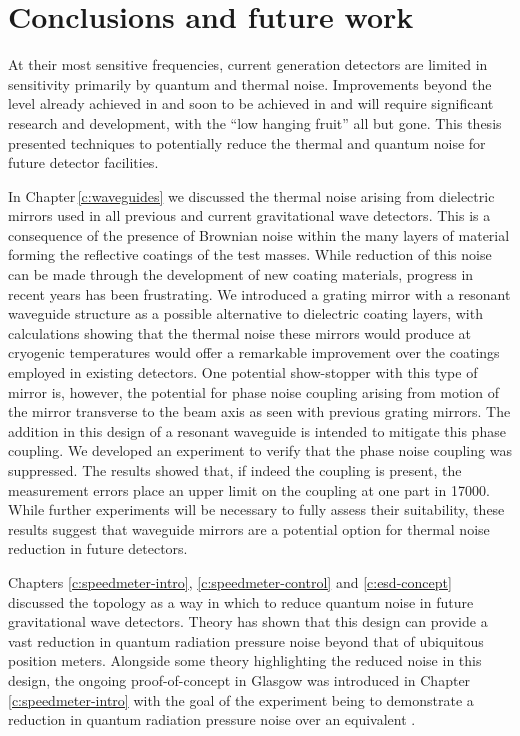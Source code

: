 \chapter{\label{c:conclusion}Conclusions and future work}

At their most sensitive frequencies, current generation detectors are limited in sensitivity primarily by quantum and thermal noise. Improvements beyond the level already achieved in \ALIGO{} and soon to be achieved in \AVIRGO{} and \KAGRA{} will require significant research and development, with the ``low hanging fruit'' all but gone. This thesis presented techniques to potentially reduce the thermal and quantum noise for future detector facilities.

In Chapter\,\ref{c:waveguides} we discussed the thermal noise arising from dielectric mirrors used in all previous and current gravitational wave detectors. This is a consequence of the presence of Brownian noise within the many layers of material forming the reflective coatings of the test masses. While reduction of this noise can be made through the development of new coating materials, progress in recent years has been frustrating. We introduced a grating mirror with a resonant waveguide structure as a possible alternative to dielectric coating layers, with calculations showing that the thermal noise these mirrors would produce at cryogenic temperatures would offer a remarkable improvement over the coatings employed in existing detectors. One potential show-stopper with this type of mirror is, however, the potential for phase noise coupling arising from motion of the mirror transverse to the beam axis as seen with previous grating mirrors. The addition in this design of a resonant waveguide is intended to mitigate this phase coupling. We developed an experiment to verify that the phase noise coupling was suppressed. The results showed that, if indeed the coupling is present, the measurement errors place an upper limit on the coupling at one part in \num{17000}. While further experiments will be necessary to fully assess their suitability, these results suggest that waveguide mirrors are a potential option for thermal noise reduction in future detectors.

Chapters \ref{c:speedmeter-intro}, \ref{c:speedmeter-control} and \ref{c:esd-concept} discussed the \emph{\SM{}} topology as a way in which to reduce quantum noise in future gravitational wave detectors. Theory has shown that this design can provide a vast reduction in quantum radiation pressure noise beyond that of ubiquitous position meters. Alongside some theory highlighting the reduced noise in this design, the ongoing proof-of-concept \SSMEXPT{} in Glasgow was introduced in Chapter\,\ref{c:speedmeter-intro} with the goal of the experiment being to demonstrate a reduction in quantum radiation pressure noise over an equivalent \MI{}.

